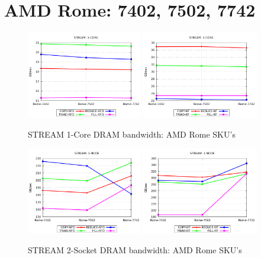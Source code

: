 \documentclass{article}
\begin{document}
\section{AMD Rome: 7402, 7502, 7742}
\begin{figure}[!hb]
    \centering
    \includegraphics[width=0.45\textwidth]{../data/rome-7402-7502-7742/mem_bw_core/mb_core_rfo}
    \includegraphics[width=0.45\textwidth]{../data/rome-7402-7502-7742/mem_bw_core/mb_core_nt}
    \caption{STREAM 1-Core DRAM bandwidth: AMD Rome SKU's}
    \label{figure:mem_bw_core_rome_skus}
\end{figure}
\begin{figure}[!hb]
    \centering
    \includegraphics[width=0.45\textwidth]{../data/rome-7402-7502-7742/mem_bw_node/mb_node_rfo}
    \includegraphics[width=0.45\textwidth]{../data/rome-7402-7502-7742/mem_bw_node/mb_node_nt}
    \caption{STREAM 2-Socket DRAM bandwidth: AMD Rome SKU's}
    \label{figure:mem_bw_node_rome_skus}
\end{figure}
\end{document}
